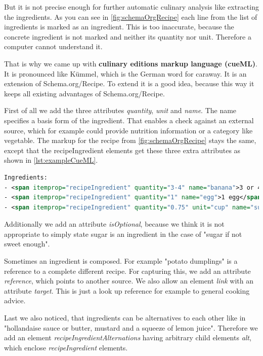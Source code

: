 \documentclass[12pt, twoside]{report}
\begin{document}
But it is not precise enough for further automatic culinary analysis like extracting the ingredients. As you can see in \cref{fig:schemaOrgRecipe} each line from the list of ingredients is marked as an ingredient. This is too inaccurate, because the concrete ingredient is not marked and neither its quantity nor unit. Therefore a computer cannot understand it.

That is why we came up with \textbf{culinary editions markup language (cueML)}. It is pronounced like Kümmel, which is the German word for caraway. It is an extension of Schema.org/Recipe. To extend it is a good idea, because this way it keeps all existing advantages of Schema.org/Recipe.

First of all we add the three attributes \textit{quantity}, \textit{unit} and \textit{name}. The name specifies a basis form of the ingredient. That enables a check against an external source, which for example could provide nutrition information or a category like vegetable. The markup for the recipe from \cref{fig:schemaOrgRecipe} stays the same, except that the recipeIngredient elements get these three extra attributes as shown in \cref{lst:exampleCueML}.

\begin{minipage}{\linewidth} %
\begin{lstlisting}[language=XML, caption={Example for cueML}, label=lst:exampleCueML]
Ingredients:
- <span itemprop="recipeIngredient" quantity="3-4" name="banana">3 or 4 ripe bananas, smashed</span>
- <span itemprop="recipeIngredient" quantity="1" name="egg">1 egg</span>
- <span itemprop="recipeIngredient" quantity="0.75" unit="cup" name="sugar">3/4 cup of sugar</span>
\end{lstlisting}
\end{minipage}

Additionally we add an attribute \textit{isOptional}, because we think it is not appropriate to simply state sugar is an ingredient in the case of "sugar if not sweet enough". 

Sometimes an ingredient is composed. For example "potato dumplings" is a reference to a complete different recipe. For capturing this, we add an attribute \textit{reference}, which points to another source. We also allow an element \textit{link} with an attribute \textit{target}. This is just a look up reference for example to general cooking advice. 

Last we also noticed, that ingredients can be alternatives to each other like in "hollandaise sauce or butter, mustard and a squeeze of lemon juice". Therefore we add an element \textit{recipeIngredientAlternations} having arbitrary child elements \textit{alt}, which enclose \textit{recipeIngredient} elements.
\end{document}
